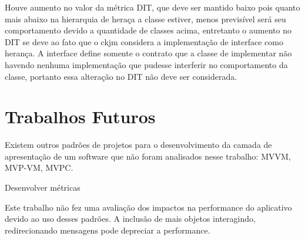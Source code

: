 Houve aumento no valor da métrica DIT, que deve ser mantido baixo pois quanto
mais abaixo na hierarquia de heraça a classe estiver, menos previsível será seu
comportamento devido a quantidade de classes acima, entretanto o aumento no DIT
se deve ao fato que o ckjm considera a implementação de interface como herança.
A interface define somente o contrato que a classe de implementar não havendo
nenhuma implementação que pudesse interferir no comportamento da classe,
portanto essa alteração no DIT não deve ser considerada.




\section{Trabalhos Futuros}

Existem outros padrões de projetos para o desenvolvimento da camada de
apresentação de um software que não foram analisados nesse trabalho: MVVM,
MVP-VM, MVPC.

Desenvolver métricas


Este trabalho não fez uma avaliação dos impactos na performance do aplicativo
devido ao uso desses padrões. A inclusão de mais objetos interagindo,
redirecionando mensagens pode depreciar a performance.
